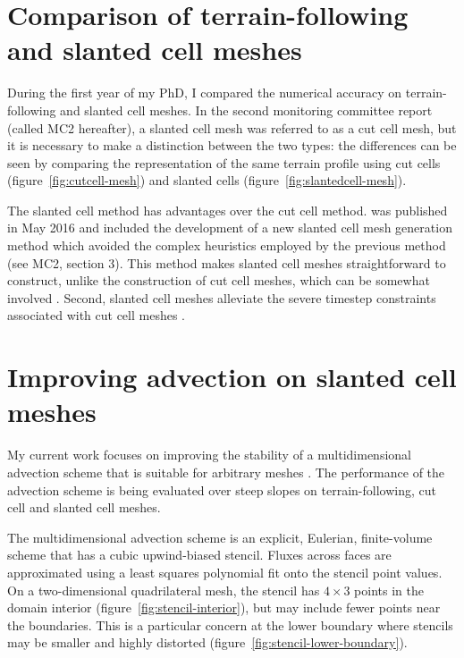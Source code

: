 \documentclass[a4paper,11pt]{article}
\begin{document}
\section{Comparison of terrain-following and slanted cell meshes}
\label{sec:tf-slanted-cells}

During the first year of my PhD, I compared the numerical accuracy on terrain-following and slanted cell meshes.
In the second monitoring committee report (called MC2 hereafter), a slanted cell mesh was referred to as a cut cell mesh, but it is necessary to make a distinction between the two types: the differences can be seen by comparing the representation of the same terrain profile using cut cells (figure~\ref{fig:cutcell-mesh}) and slanted cells (figure~\ref{fig:slantedcell-mesh}).

The slanted cell method has advantages over the cut cell method.
\citet{shaw-weller2016} was published in May 2016 and included the development of a new slanted cell mesh generation method which avoided the complex heuristics employed by the previous method (see MC2, section 3).
This method makes slanted cell meshes straightforward to construct, unlike the construction of cut cell meshes, which can be somewhat involved \citep{hartkopf2011}.  Second, slanted cell meshes alleviate the severe timestep constraints associated with cut cell meshes \citep{shaw-weller2016}.

\section{Improving advection on slanted cell meshes}
\label{sec:advection}

My current work focuses on improving the stability of a multidimensional advection scheme that is suitable for arbitrary meshes \citep{weller-shahrokhi2014}.  The performance of the advection scheme is being evaluated over steep slopes on terrain-following, cut cell and slanted cell meshes.

The multidimensional advection scheme is an explicit, Eulerian, finite-volume scheme that has a cubic upwind-biased stencil.  Fluxes across faces are approximated using a least squares polynomial fit onto the stencil point values.
On a two-dimensional quadrilateral mesh, the stencil has $4 \times 3$ points in the domain interior (figure~\ref{fig:stencil-interior}), but may include fewer points near the boundaries.  This is a particular concern at the lower boundary where stencils may be smaller and highly distorted (figure~\ref{fig:stencil-lower-boundary}).
\end{document}
